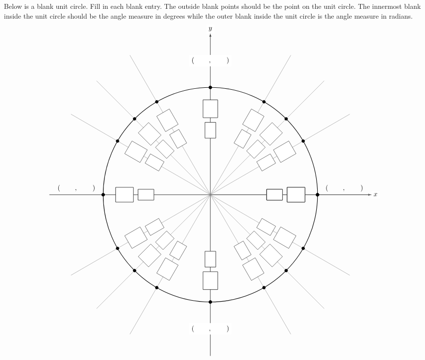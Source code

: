 \documentclass[12pt,letterpaper]{exam}
\begin{document}
\begin{questions}

\newpage
{} \par\vspace{0.3cm}

Below is a blank unit circle. Fill in each blank entry. The outside blank points should be the point on the unit circle. The innermost blank inside the unit circle should be the angle measure in degrees while the outer blank inside the unit circle is the angle measure in radians. 
	\[
	\begin{tikzpicture}[scale=5.5,cap=round,>=latex]

        \draw[->] (-1.5cm ,0cm) -- (1.5cm, 0cm) node[right, fill= white] {$x$};
        \draw[->] (0cm, -1.5cm) -- (0cm, 1.5cm) node[above, fill= white] {$y$};

        \draw[thick] (0cm,0cm) circle(1cm);

        \foreach \x in {0,30,...,360} {
                \draw[gray] (0cm, 0cm) -- (\x:1.5cm);
                \filldraw[black] (\x:1cm) circle(0.4pt);
		\draw node[draw, fill= white, shape= rectangle, minimum height= 0.55cm, minimum width= 0.8cm, anchor= center, rotate= \x] at (\x:0.6cm) {};
		\draw node[draw, fill= white, shape= rectangle, minimum height= 0.75cm, minimum width= 0.9cm, anchor= center, rotate= \x] at (\x:0.8cm) {};
	}
	
	\foreach \x in {0,45,...,360} {
		\draw[gray] (0cm, 0cm) -- (\x:1.5cm);
		\filldraw[black] (\x:1cm) circle(0.4pt);
		\draw node[draw, fill= white, shape= rectangle, minimum height= 0.55cm, minimum width= 0.8cm, anchor= center, rotate= \x] at (\x:0.6cm) {};
		\draw node[draw, fill= white, shape= rectangle, minimum height= 0.75cm, minimum width= 0.9cm, anchor= center, rotate= \x] at (\x:0.8cm) {};
	}
		
        \draw (-1.25cm,0cm) node[above=1pt] {$(\hspace{.75cm},\hspace{.75cm})$}
	(1.25cm,0cm)  node[above=1pt] {$(\hspace{.75cm},\hspace{.75cm})$}
	(0cm,-1.25cm) node[fill=white] {$(\hspace{.75cm},\hspace{.75cm})$}
	(0cm,1.25cm)  node[fill=white] {$(\hspace{.75cm},\hspace{.75cm})$};


\end{tikzpicture}\]
\end{questions}
\end{document}
